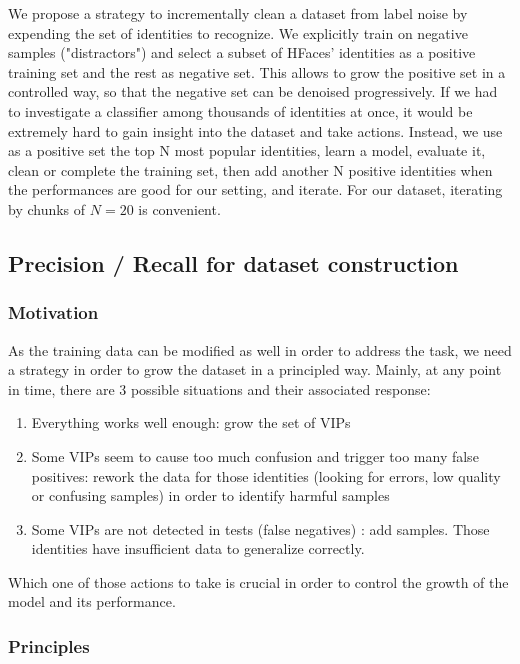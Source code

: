 We propose a strategy to incrementally clean a dataset from label noise by expending the set of identities to recognize. We explicitly train on negative samples ("distractors") and select a subset of HFaces' identities as a positive training set and the rest as negative set. This allows to grow the positive set in a controlled way, so that the negative set can be denoised progressively. If we had to investigate a classifier among thousands of identities at once, it would be extremely hard to gain insight into the dataset and take actions. Instead, we use as a positive set the top N most popular identities, learn a model, evaluate it, clean or complete the training set, then add another N positive identities when the performances are good for our setting, and iterate. For our dataset, iterating by chunks of $N=20$ is convenient.

\subsection{Precision / Recall for dataset construction}
\label{sec:pr-dataset}
\subsubsection{Motivation}

As the training data can be modified as well in order to address the task, we need a strategy in order to grow the dataset in a principled way. Mainly, at any point in time, there are 3 possible situations and their associated response:
\begin{enumerate}
    \item Everything works well enough: grow the set of VIPs
    \item Some VIPs seem to cause too much confusion and trigger too many false positives: rework the data for those identities (looking for errors, low quality or confusing samples) in order to identify harmful samples
    \item Some VIPs are not detected in tests (false negatives) : add samples. Those identities have insufficient data to generalize correctly.
\end{enumerate}

Which one of those actions to take is crucial in order to control the growth of the model and its performance.

\subsubsection{Principles}

